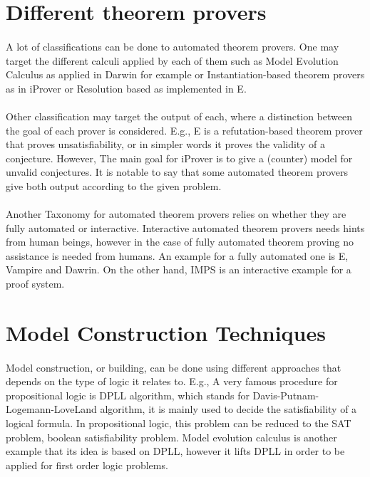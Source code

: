 \section{Different theorem provers}
\paragraph{}
A lot of classifications can be done to automated theorem provers. One may target the different calculi applied by each of them such as Model Evolution Calculus as applied in Darwin for example or Instantiation-based theorem provers as in iProver or Resolution based as implemented in E.

\paragraph{}
Other classification may target the output of each, where a distinction between the goal of each prover is considered. E.g., E is a refutation-based theorem prover that proves unsatisfiability, or in simpler words it proves the validity of a conjecture. However, The main goal for iProver is to give a (counter) model for unvalid conjectures. It is notable to say that some automated theorem provers give both output according to the given problem.

\paragraph{}
Another Taxonomy for automated theorem provers relies on whether they are fully automated or interactive. Interactive automated theorem provers needs hints from human beings, however in the case of fully automated theorem proving no assistance is needed from humans. An example for a fully automated one is E, Vampire and Dawrin. On the other hand, IMPS \cite{IMPS} is an interactive example for a proof system.


\section{Model Construction Techniques}
\paragraph{}
Model construction, or building, can be done using different approaches that depends on the type of logic it relates to. E.g., A very famous procedure for propositional logic is DPLL algorithm, which stands for Davis-Putnam-Logemann-LoveLand algorithm, it is mainly used to decide the satisfiability of a logical formula. In propositional logic, this problem can be reduced to the SAT problem, boolean satisfiability problem. Model evolution calculus is another example that its idea is based on DPLL, however it lifts DPLL in order to be applied for first order logic problems.

